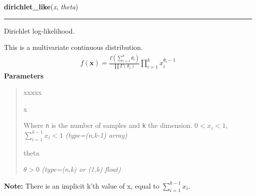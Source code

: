 \hspace{.8\funcindent}\begin{boxedminipage}{\funcwidth}

    \raggedright \textbf{dirichlet\_like}(\textit{x}, \textit{theta})

    \vspace{-1.5ex}

    \rule{\textwidth}{0.5\fboxrule}
\setlength{\parskip}{2ex}

Dirichlet log-likelihood.

This is a multivariate continuous distribution.
\begin{equation*}\begin{split}f(\mathbf{x}) = \frac{\Gamma(\sum_{i=1}^k \theta_i)}{\prod \Gamma(\theta_i)} \prod_{i=1}^k x_i^{\theta_i - 1}\end{split}\end{equation*}\setlength{\parskip}{1ex}
      \textbf{Parameters}
      \vspace{-1ex}

      \begin{quote}
        \begin{Ventry}{xxxxx}

          \item[x]


Where \texttt{n} is the number of samples and \texttt{k} the dimension.
$0 < x_i < 1$,  $\sum_{i=1}^{k-1} x_i < 1$
            {\it (type=(n,k-1) array)}

          \item[theta]


$\theta > 0$
            {\it (type=(n,k) or (1,k) float)}

        \end{Ventry}

      \end{quote}

\textbf{Note:} 
There is an implicit k'th value of x, equal to $\sum_{i=1}^{k-1} x_i$.


    \end{boxedminipage}

    \label{pymc:distributions:discrete_uniform_like}

    \vspace{0.5ex}

